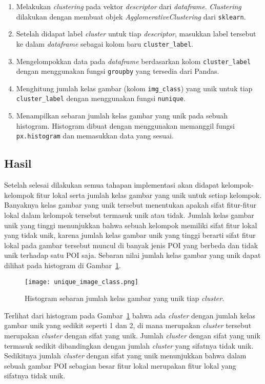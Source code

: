 \begin{enumerate}
	\item Melakukan \textit{clustering} pada vektor \textit{descriptor} dari \textit{dataframe}. \textit{Clustering} dilakukan dengan membuat objek \textit{AgglomerativeClustering} dari \texttt{sklearn}. 
	\item Setelah didapat label \textit{cluster} untuk tiap \textit{descriptor}, masukkan label tersebut ke dalam \textit{dataframe} sebagai kolom baru \texttt{cluster\_label}.
	\item Mengelompokkan data pada \textit{dataframe} berdasarkan kolom \texttt{cluster\_label} dengan menggunakan fungsi \texttt{groupby} yang tersedia dari Pandas. 
	\item Menghitung jumlah kelas gambar (kolom \texttt{img\_class}) yang unik untuk tiap \texttt{cluster\_label} dengan menggunakan fungsi \texttt{nunique}.
	\item Menampilkan sebaran jumlah kelas gambar yang unik pada sebuah histogram. Histogram dibuat dengan menggunakan memanggil fungsi \texttt{px.histogram} dan memasukkan data yang sesuai.
\end{enumerate}

\subsection{Hasil}
Setelah selesai dilakukan semua tahapan implementasi akan didapat kelompok-kelompok fitur lokal serta jumlah kelas gambar yang unik untuk setiap kelompok. Banyaknya kelas gambar yang unik tersebut menentukan apakah sifat fitur-fitur lokal dalam kelompok tersebut termasuk unik atau tidak. Jumlah kelas gambar unik yang tinggi menunjukkan bahwa sebuah kelompok memiliki sifat fitur lokal yang tidak unik, karena jumlah kelas gambar unik yang tinggi berarti sifat fitur lokal pada gambar tersebut muncul di banyak jenis POI yang berbeda dan tidak unik terhadap satu POI saja. Sebaran nilai jumlah kelas gambar yang unik dapat dilihat pada histogram di Gambar~\ref{fig:unique_image_class}.
\begin{figure}[H]
	\centering
	\texttt{[image: unique\_image\_class.png]}
	\caption{Histogram sebaran jumlah kelas gambar yang unik tiap \textit{cluster}.}
	\label{fig:unique_image_class}
\end{figure}
Terlihat dari histogram pada Gambar~\ref{fig:unique_image_class} bahwa ada \textit{cluster} dengan jumlah kelas gambar unik yang sedikit seperti 1 dan 2, di mana merupakan \textit{cluster} tersebut merupakan \textit{cluster} dengan sifat yang unik. Jumlah \textit{cluster} dengan sifat yang unik termasuk sedikit dibandingkan dengan jumlah \textit{cluster} yang sifatnya tidak unik. Sedikitnya jumlah \textit{cluster} dengan sifat yang unik menunjukkan bahwa dalam sebuah gambar POI sebagian besar fitur lokal merupakan fitur lokal yang sifatnya tidak unik.

